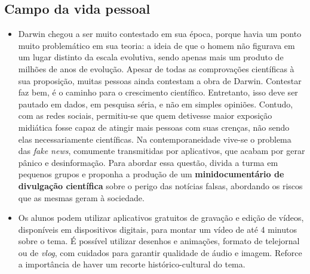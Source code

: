 \documentclass[11pt]{extarticle}
\begin{document}
\subsection{Campo da vida pessoal}

\begin{comment}
``O campo da vida pessoal pretende funcionar como espaço de articulações
e sínteses das aprendizagens de outros campos postas a serviço dos projetos de
vida dos estudantes. As práticas de linguagem privilegiadas nesse campo
relacionam-se com a ampliação do saber sobre si, tendo em vista as condições
que cercam a vida contemporânea e as condições juvenis no Brasil e no mundo.

Está em questão também possibilitar vivências significativas de práticas
colaborativas em situações de interação presenciais ou em ambientes digitais
e aprender, na articulação com outras áreas, campos e com os projetos
e escolhas pessoais dos jovens, procedimentos de levantamento, tratamento
e divulgação de dados e informações e o uso desses dados em produções diversas
e na proposição de ações e projetos de natureza variada, para fomentar
o protagonismo juvenil de forma contextualizada.'' (BNCC, p. 494)
\end{comment}

\begin{itemize} \item Darwin chegou a ser muito contestado em sua época, porque
      havia um ponto muito problemático em sua teoria: a ideia de que o homem
      não figurava em um lugar distinto da escala evolutiva, sendo apenas mais
      um produto de milhões de anos de evolução. Apesar de todas as
      comprovações científicas à sua proposição, muitas pessoas ainda contestam
      a obra de Darwin. Contestar faz bem, é o caminho para o crescimento
      científico. Entretanto, isso deve ser pautado em dados, em pesquisa
      séria, e não em simples opiniões. Contudo, com as redes sociais,
      permitiu-se que quem detivesse maior exposição midiática fosse capaz de
      atingir mais pessoas com suas crenças, não sendo elas necessariamente
      científicas. Na contemporaneidade vive-se o problema das \emph{fake
      news}, comumente transmitidas por aplicativos, que acabam por gerar
      pânico e desinformação. Para abordar essa questão, divida a turma em
      pequenos grupos e proponha a produção de um \textbf{minidocumentário de
      divulgação científica} sobre o perigo das notícias falsas, abordando os
      riscos que as mesmas geram à sociedade. 

\item Os alunos podem utilizar aplicativos gratuitos de gravação
  e edição de vídeos, disponíveis em dispositivos digitais, para montar um
  vídeo de até 4 minutos sobre o tema. É possível utilizar desenhos
  e animações, formato de telejornal ou de \emph{vlog}, com cuidados para
  garantir qualidade de áudio e imagem. Reforce a importância de haver um
recorte histórico-cultural do tema.  \end{itemize}
\end{document}
